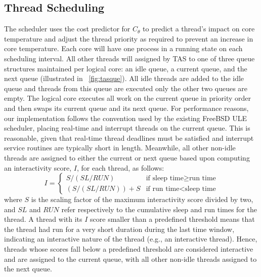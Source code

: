 \documentclass[times, 10pt,twocolumn]{IEEEtran}
\begin{document}
\subsection{Thread Scheduling}
\label{sec:selection} 
The scheduler uses the cost predictor for $C_{\theta}$ to predict a
thread's impact on core temperature and adjust the thread priority as
required to prevent an increase in core temperature. Each core will have
one process in a running state on each scheduling interval. All other
threads will assigned by TAS to one of three queue structures maintained
per logical core: an idle queue, a current queue, and the next queue
(illustrated in \figurename~\ref{fig:tasque}).  All idle threads are
added to the idle queue and threads from this queue are executed only
the other two queues are empty.  The logical core executes all work on
the current queue in priority order and then swaps its current queue and
its next queue. For performance reasons, our implementation follows the
convention used by the existing FreeBSD ULE scheduler, placing real-time
and interrupt threads on the current queue.  This is reasonable,
given that real-time thread deadlines must be satisfied and
interrupt service routines are typically short in length.
Meanwhile, all other non-idle threads are assigned to either the current or next
queue based upon computing an interactivity score, $I$, for each thread, as follows:
\begin{equation}
\label{eq:interactsleeprun} 
I =   
\begin{cases}
  S / (SL/RUN) & \text{if sleep time} \geq \text{run time}\\
  (S/ (SL / RUN))+S & \text{if run time} < \text{sleep time}
\end{cases}
\end{equation}
where $S$ is the scaling factor of the
maximum interactivity score divided by two, and $SL$ and $RUN$ refer
respectively to the cumulative sleep and run times for the thread.
A thread with its $I$ score smaller than a predefined threshold means that
the thread had run for a very short duration during the last time window,
indicating an interactive nature of the thread (e.g., an interactive thread).   
Hence, threads whose scores fall below a predefined threshold are considered
interactive and are assigned to the current queue, with all other non-idle
threads assigned to the next queue.
\end{document}
